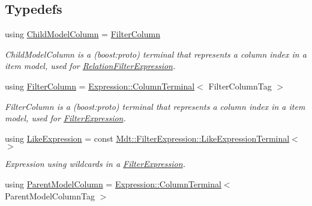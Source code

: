 \subsection*{Typedefs}
\begin{DoxyCompactItemize}
\item 
using \hyperlink{namespace_mdt_1_1_item_model_a60ac754611ae43e31bbe5244b2d24297}{Child\+Model\+Column} = \hyperlink{namespace_mdt_1_1_item_model_ab26db9f7af785f84cb82892583f7609c}{Filter\+Column}
\begin{DoxyCompactList}\small\item\em Child\+Model\+Column is a (boost\+:proto) terminal that represents a column index in a item model, used for \hyperlink{class_mdt_1_1_item_model_1_1_relation_filter_expression}{Relation\+Filter\+Expression}. \end{DoxyCompactList}\item 
using \hyperlink{namespace_mdt_1_1_item_model_ab26db9f7af785f84cb82892583f7609c}{Filter\+Column} = \hyperlink{struct_mdt_1_1_item_model_1_1_expression_1_1_column_terminal}{Expression\+::\+Column\+Terminal}$<$ Filter\+Column\+Tag $>$\hypertarget{namespace_mdt_1_1_item_model_ab26db9f7af785f84cb82892583f7609c}{}\label{namespace_mdt_1_1_item_model_ab26db9f7af785f84cb82892583f7609c}

\begin{DoxyCompactList}\small\item\em Filter\+Column is a (boost\+:proto) terminal that represents a column index in a item model, used for \hyperlink{class_mdt_1_1_item_model_1_1_filter_expression}{Filter\+Expression}. \end{DoxyCompactList}\item 
using \hyperlink{namespace_mdt_1_1_item_model_a8c8326d469af353aa345651a135251b0}{Like\+Expression} = const \hyperlink{struct_mdt_1_1_filter_expression_1_1_like_expression_terminal}{Mdt\+::\+Filter\+Expression\+::\+Like\+Expression\+Terminal}$<$$>$\hypertarget{namespace_mdt_1_1_item_model_a8c8326d469af353aa345651a135251b0}{}\label{namespace_mdt_1_1_item_model_a8c8326d469af353aa345651a135251b0}

\begin{DoxyCompactList}\small\item\em Expression using wildcards in a \hyperlink{class_mdt_1_1_item_model_1_1_filter_expression}{Filter\+Expression}. \end{DoxyCompactList}\item 
using \hyperlink{namespace_mdt_1_1_item_model_a65a3c4f6cfb3d80d7f69e58cd17d8be7}{Parent\+Model\+Column} = \hyperlink{struct_mdt_1_1_item_model_1_1_expression_1_1_column_terminal}{Expression\+::\+Column\+Terminal}$<$ Parent\+Model\+Column\+Tag $>$\hypertarget{namespace_mdt_1_1_item_model_a65a3c4f6cfb3d80d7f69e58cd17d8be7}{}\label{namespace_mdt_1_1_item_model_a65a3c4f6cfb3d80d7f69e58cd17d8be7}


\end{DoxyCompactItemize}
